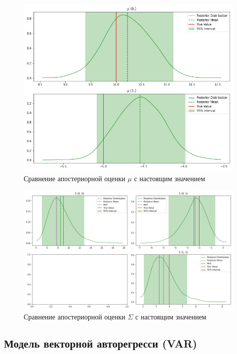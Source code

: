 \documentclass[a4paper,14pt]{extreport}
\begin{document}
\begin{figure}[H]
	\includegraphics[width=\linewidth]{img/gen/pp_mvn_mu_hdi.png}
	\caption{Сравнение апостериорной оценки $\mu$ с настоящим значением}
	\label{fig:pp_mvn_mu_hdi}
\end{figure}

\begin{figure}[H]
	\includegraphics[width=\linewidth]{img/gen/pp_mvn_sigma_hdi.png}
	\caption{Сравнение апостериорной оценки $\Sigma$ с настоящим значением}
	\label{fig:pp_mvn_sigma_hdi}
\end{figure}


\subsection{Модель векторной авторегресси (VAR)}
\end{document}
